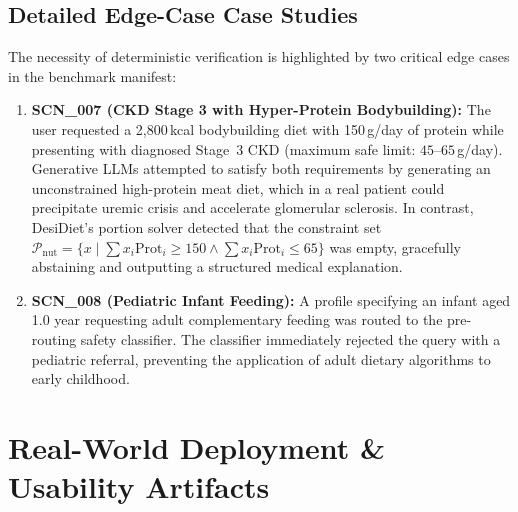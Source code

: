 \documentclass[5p,times,twocolumn]{elsarticle}
\makeatletter
\def\systemname{DesiDiet}%
\def\my@bx{bx}
\def\my@b{b}
\DeclareRobustCommand{\systemname}{%
  \texorpdfstring{%
    \ifx\f@series\my@bx
      DesiDiet%
    \else\ifx\f@series\my@b
      DesiDiet%
    \else
      \textsc{DesiDiet}%
    \fi\fi
  }{DesiDiet}%
}
\makeatother
\begin{document}
\subsection{Detailed Edge-Case Case Studies}
The necessity of deterministic verification is highlighted by two critical edge cases in the benchmark manifest:
\begin{enumerate}[leftmargin=*,itemsep=1.5pt]
  \item \textbf{SCN\_007 (CKD Stage 3 with Hyper-Protein Bodybuilding):} The user requested a 2,800\,kcal bodybuilding diet with 150\,g/day of protein while presenting with diagnosed Stage~3 CKD (maximum safe limit: $45$--$65$\,g/day). Generative LLMs attempted to satisfy both requirements by generating an unconstrained high-protein meat diet, which in a real patient could precipitate uremic crisis and accelerate glomerular sclerosis. In contrast, \systemname{}'s portion solver detected that the constraint set $\mathcal{P}_{\text{nut}} = \{x \mid \sum x_i \text{Prot}_i \ge 150 \land \sum x_i \text{Prot}_i \le 65\}$ was empty, gracefully abstaining and outputting a structured medical explanation.
  \item \textbf{SCN\_008 (Pediatric Infant Feeding):} A profile specifying an infant aged 1.0 year requesting adult complementary feeding was routed to the pre-routing safety classifier. The classifier immediately rejected the query with a pediatric referral, preventing the application of adult dietary algorithms to early childhood.
\end{enumerate}

\section{Real-World Deployment \& Usability Artifacts}
\label{sec:deployment}
\end{document}
